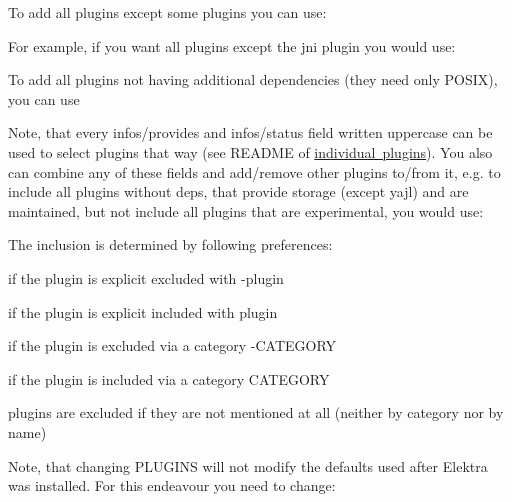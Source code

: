 To add all plugins except some plugins you can use\+:


\begin{DoxyCode}{0}
\end{DoxyCode}


For example, if you want all plugins except the jni plugin you would use\+:


\begin{DoxyCode}{0}
\end{DoxyCode}


To add all plugins not having additional dependencies (they need only P\+O\+S\+IX), you can use


\begin{DoxyCode}{0}
\end{DoxyCode}


Note, that every {\ttfamily infos/provides} and {\ttfamily infos/status} field written uppercase can be used to select plugins that way (see R\+E\+A\+D\+ME of \mbox{\hyperlink{src_plugins_README_md}{individual plugins}}). You also can combine any of these fields and add/remove other plugins to/from it, e.\+g. to include all plugins without deps, that provide storage (except {\ttfamily yajl}) and are maintained, but not include all plugins that are experimental, you would use\+:


\begin{DoxyCode}{0}
\end{DoxyCode}


The inclusion is determined by following preferences\+:


\begin{DoxyEnumerate}
\item if the plugin is explicit excluded with {\ttfamily -\/plugin}
\item if the plugin is explicit included with {\ttfamily plugin}
\item if the plugin is excluded via a category {\ttfamily -\/C\+A\+T\+E\+G\+O\+RY}
\item if the plugin is included via a category {\ttfamily C\+A\+T\+E\+G\+O\+RY}
\item plugins are excluded if they are not mentioned at all (neither by category nor by name)
\end{DoxyEnumerate}

Note, that changing {\ttfamily P\+L\+U\+G\+I\+NS} will not modify the defaults used after Elektra was installed. For this endeavour you need to change\+:


